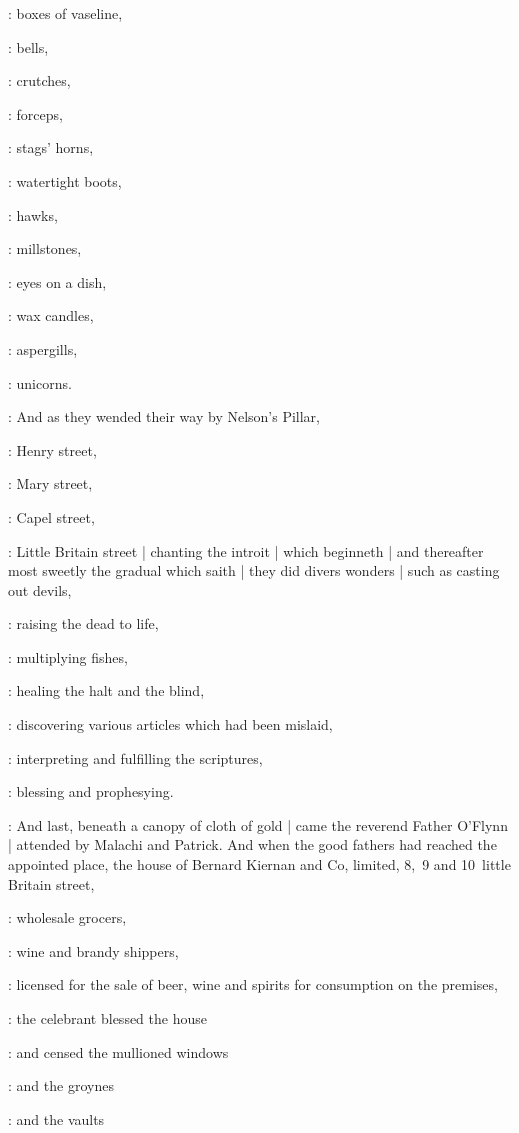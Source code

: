 :
boxes of vaseline,

:
bells,

:
crutches,

:
forceps,

:
stags' horns,

:
watertight boots,

:
hawks,

:
millstones,

:
eyes on a dish,

:
wax candles,

:
aspergills,

:
unicorns.

:
And as they wended their way by Nelson's Pillar,

:
Henry street,

:
Mary street,

:
Capel street,

:
Little Britain street |
chanting the introit  |
which beginneth
 |
and thereafter most sweetly the gradual 
which saith  |
they did divers wonders |
such as casting out devils,

:
raising the dead to life,

:
multiplying fishes,

:
healing the halt and the blind,

:
discovering various articles which had been mislaid,

:
interpreting and fulfilling the scriptures,

:
blessing and prophesying.

:
And last,
beneath a canopy of cloth of gold |
came the reverend Father O'Flynn |
attended by Malachi and Patrick.
And when the good fathers had reached the appointed place,
the house of Bernard Kiernan and Co,
limited,
8,~9 and 10~little Britain street,

:
wholesale grocers,

:
wine and brandy shippers,

:
licensed for the sale of beer,
wine and spirits for consumption on the premises,

:
the celebrant blessed the house

:
and censed the mullioned windows

:
and the groynes

:
and the vaults

